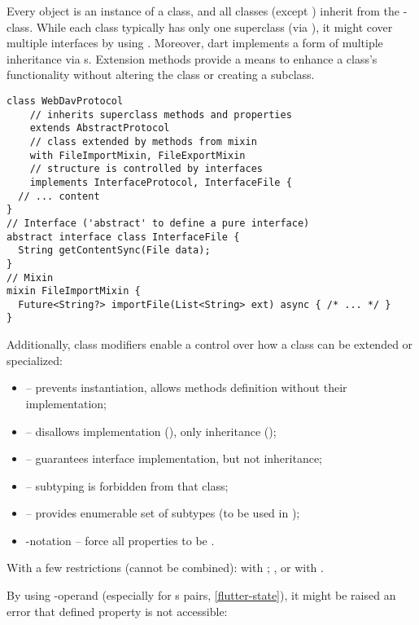 Every object is an instance of a class, and all classes (except ) inherit from the -class. While each 
class typically has only one superclass (via ), it might cover multiple interfaces by using .
Moreover, dart implements a form of multiple inheritance via s. Extension methods provide a means to 
enhance a class's functionality without altering the class or creating a subclass.

\begin{lstlisting}
class WebDavProtocol
    // inherits superclass methods and properties
    extends AbstractProtocol 
    // class extended by methods from mixin
    with FileImportMixin, FileExportMixin 
    // structure is controlled by interfaces
    implements InterfaceProtocol, InterfaceFile {
  // ... content
}
// Interface ('abstract' to define a pure interface)
abstract interface class InterfaceFile {
  String getContentSync(File data);
}
// Mixin
mixin FileImportMixin {
  Future<String?> importFile(List<String> ext) async { /* ... */ }
}
\end{lstlisting}
  
\noindent Additionally, class modifiers enable a control over how a class can be extended or specialized:

\begin{itemize}
  \item {} -- prevents instantiation, allows methods definition without their implementation;
  \item {} -- disallows implementation (), only inheritance ();
  \item {} -- guarantees interface implementation, but not inheritance;
  \item {} -- subtyping is forbidden from that class;
  \item {} -- provides enumerable set of subtypes (to be used in );
  \item {}-notation -- force all properties to be .
\end{itemize}

\noindent With a few restrictions (cannot be combined):  with ; ,  or 
 with .

\noindent By using -operand (especially for s pairs, \ref{flutter-state}), it might be 
raised an error that defined property is not accessible:

